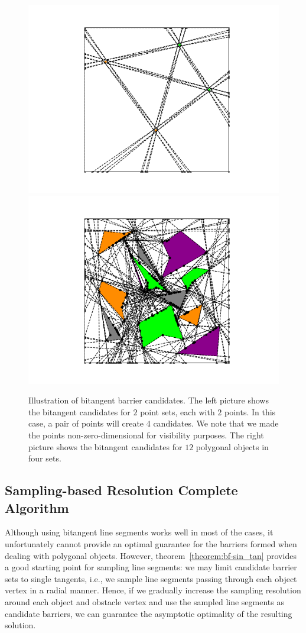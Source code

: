 \begin{figure}[ht]
    \centering
    \includegraphics[trim=80 20 80 20,clip, width = .24\textwidth]{chapters/bf/fig/candidate_1.png}
    \hspace{-.1in}
    \includegraphics[trim=80 20 80 20,clip, width = .24\textwidth]{chapters/bf/fig/candidate_2.png}
    \caption{Illustration of bitangent barrier candidates. The left picture shows the bitangent
    candidates for $2$ point sets, each with $2$ points. In this case, a pair of points will create $4$ candidates. 
    We note that we made the points non-zero-dimensional for visibility purposes. 
    The right picture shows the bitangent candidates for $12$ polygonal objects in four sets.}
    \label{fig:bf-barrier_candidates}
\end{figure}

\subsection{Sampling-based Resolution Complete Algorithm}
Although using bitangent line segments works well in most of the cases, it unfortunately cannot provide an optimal guarantee for the barriers formed when dealing with polygonal objects.
However, theorem~\ref{theorem:bf-sin_tan} provides a good starting point for sampling line segments: we may limit candidate barrier sets to single tangents, 
i.e., we sample line segments passing through each object vertex in a radial manner. 
Hence, if we gradually increase the sampling resolution around each object and obstacle vertex and use the sampled line segments as candidate barriers, 
we can guarantee the asymptotic optimality of the resulting solution.


